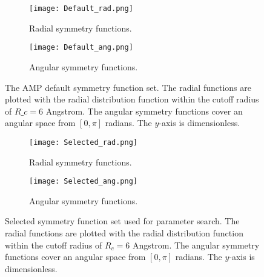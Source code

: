 \begin{figure}[H]
\begin{adjustbox}{max width=1.2\linewidth,center}
\centering
  \begin{subfigure}[b]{0.55\textwidth}
      \texttt{[image: Default\_rad.png]}
      \caption{Radial symmetry functions.}
    \label{fig:f1}
  \end{subfigure}
  \hfill
  \begin{subfigure}[b]{0.55\textwidth}
      \texttt{[image: Default\_ang.png]}
      \caption{Angular symmetry functions.}
    \label{fig:f2}
  \end{subfigure}
\end{adjustbox}
    \caption{The AMP default symmetry function set. The radial functions
    are plotted with the radial distribution function within
    the cutoff radius of $R\_c = 6$ Angstrom. The angular symmetry
    functions cover an angular space from $\left[0, \pi\right]$ radians.
    The $y$-axis is dimensionless.}
    \label{fig:default}
\end{figure}

\begin{figure}[H]
\begin{adjustbox}{max width=1.2\linewidth,center}
\centering
  \begin{subfigure}[b]{0.55\textwidth}
      \texttt{[image: Selected\_rad.png]}
      \caption{Radial symmetry functions.}
    \label{fig:f1}
  \end{subfigure}
  \hfill
  \begin{subfigure}[b]{0.55\textwidth}
      \texttt{[image: Selected\_ang.png]}
      \caption{Angular symmetry functions.}
    \label{fig:f2}
  \end{subfigure}
\end{adjustbox}
    \caption{Selected symmetry function set used for parameter search.
    The radial functions
    are plotted with the radial distribution function within
    the cutoff radius of $R_c = 6$ Angstrom. The angular symmetry
    functions cover an angular space from $\left[0, \pi\right]$ radians.
    The $y$-axis is dimensionless.}
    \label{fig:selected}
\end{figure}

